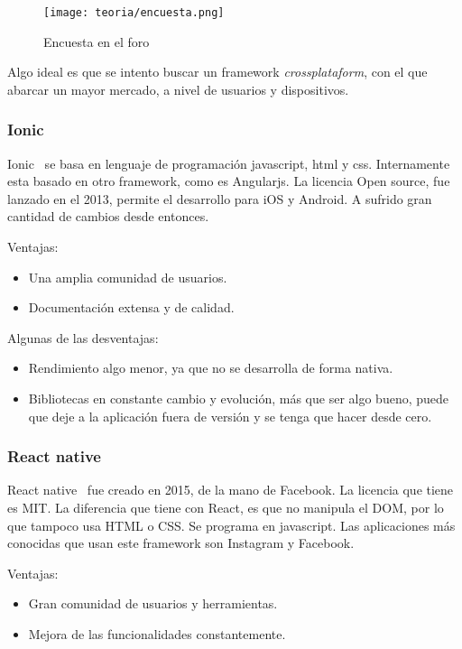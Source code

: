 \begin{figure}[h]
	\centering
	\texttt{[image: teoria/encuesta.png]}
	\caption{Encuesta en el foro}\label{fig:encuesta}
\end{figure}

Algo ideal es que se intento buscar un framework \emph{crossplataform}, con el que abarcar un mayor mercado, a nivel de usuarios y dispositivos.

\subsubsection{Ionic}
Ionic~\cite{wiki:ionnic} se basa en lenguaje de programación javascript, html y css. Internamente esta basado en otro framework, como es Angularjs. La licencia Open source, fue lanzado en el 2013, permite el desarrollo para iOS y Android. A sufrido gran cantidad de cambios desde entonces.

Ventajas:
\begin{itemize}
	\item Una amplia comunidad de usuarios.
	\item Documentación extensa y de calidad.
\end{itemize}

Algunas de las desventajas:
\begin{itemize}
	\item Rendimiento algo menor, ya que no se desarrolla de forma nativa.
	\item Bibliotecas en constante cambio y evolución, más que ser algo bueno, puede que deje a la aplicación fuera de versión y se tenga que hacer desde cero.
\end{itemize}

\subsubsection{React native}
React native~\cite{wiki:react} fue creado en 2015, de la mano de Facebook. La licencia que tiene es MIT. La diferencia que tiene con React, es que no manipula el DOM, por lo que tampoco usa HTML o CSS. 
Se programa en javascript. Las aplicaciones más conocidas que usan este framework son Instagram y Facebook.

Ventajas:
\begin{itemize}
	\item Gran comunidad de usuarios y herramientas.
	\item Mejora de las funcionalidades constantemente.
\end{itemize}

